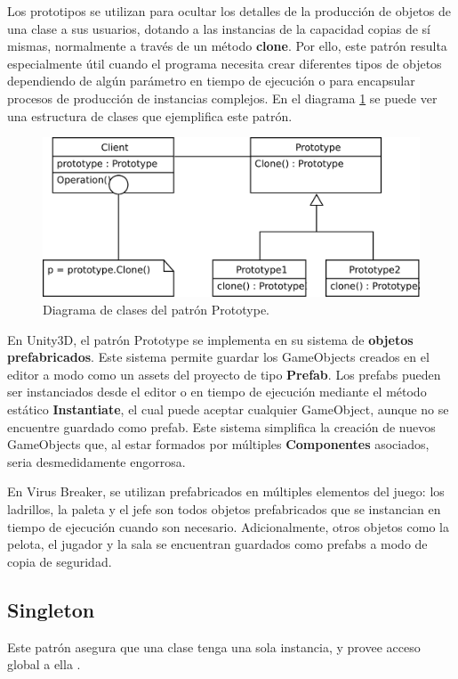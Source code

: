 Los prototipos se utilizan para ocultar los detalles de la producción de objetos de una clase a sus usuarios, dotando a las instancias de la capacidad copias de sí mismas, normalmente a través de un método \textbf{clone}. Por ello, este patrón resulta especialmente útil cuando el programa necesita crear diferentes tipos de objetos dependiendo de algún parámetro en tiempo de ejecución o para encapsular procesos de producción de instancias complejos. En el diagrama \ref{prototype_diagram} se puede ver una estructura de clases que ejemplifica este patrón.
\begin{figure}[h]
	\includegraphics[width=1\textwidth]{images/estructura/patrones/prototype}
	\centering
	\caption{Diagrama de clases del patrón Prototype.}
	\label{prototype_diagram}
\end{figure}

En Unity3D, el patrón Prototype se implementa en su sistema de \textbf{objetos prefabricados}. Este sistema permite guardar los GameObjects creados en el editor a modo como un assets del proyecto de tipo \textbf{Prefab}. Los prefabs pueden ser instanciados desde el editor o en tiempo de ejecución mediante el método estático \textbf{Instantiate}, el cual puede aceptar cualquier GameObject, aunque no se encuentre guardado como prefab. Este sistema simplifica la creación de nuevos GameObjects que, al estar formados por múltiples \textbf{Componentes} asociados, seria desmedidamente engorrosa.

En Virus Breaker, se utilizan prefabricados en múltiples elementos del juego: los ladrillos, la paleta y el jefe son todos objetos prefabricados que se instancian en tiempo de ejecución cuando son necesario. Adicionalmente, otros objetos como la pelota, el jugador y la sala se encuentran guardados como prefabs a modo de copia de seguridad.

\subsection{Singleton}
Este patrón asegura que una clase tenga una sola instancia, y provee acceso global a ella \cite{design_patterns}.

